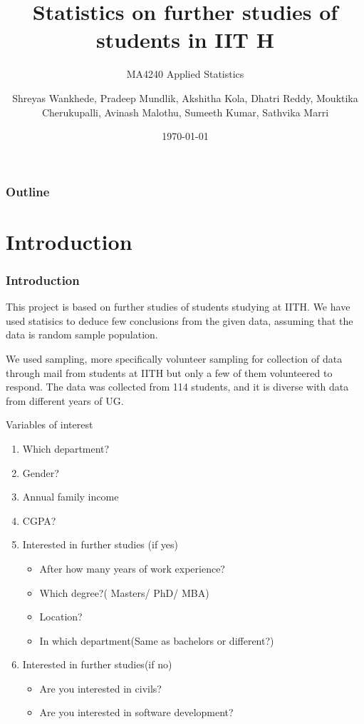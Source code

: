 \documentclass{beamer}
\title{Statistics on further studies of students in IIT H}
\subtitle{MA4240  Applied Statistics}
\author{Shreyas Wankhede, Pradeep Mundlik, Akshitha Kola, Dhatri Reddy, Mouktika Cherukupalli, Avinash Malothu, Sumeeth Kumar, Sathvika Marri}
\institute{Indian Institute of Technology Hyderabad}
\date{\today}
\begin{document}
\begin{frame}
  \titlepage
\end{frame}

\begin{frame}
  \frametitle{Outline}
  \tableofcontents
\end{frame}

\section{Introduction}
\begin{frame}
  \frametitle{Introduction}
  \begin{block}{}  
  This project is based on further studies of students studying at IITH. We have used statisics to deduce few conclusions from the given data, assuming that the data is random sample population.  
  \end{block}

  \begin{block}{}  
  We used sampling, more specifically volunteer sampling for collection of data through mail from students at IITH but only a few of them volunteered to respond. The data was collected from 114 students, and it is diverse with data from different years of UG.
  \end{block}

\end{frame}

\begin{frame}
  \begin{block}{Variables of interest}
      \begin{enumerate}
          \item Which department?
          \item Gender?
          \item Annual family income
          \item CGPA?
          \item Interested in further studies (if yes) 
          \begin{itemize}
              \item After how many years of work experience?
              \item Which degree?( Masters/ PhD/ MBA)
              \item Location?
              \item In which department(Same as bachelors or different?)
          \end{itemize}
          \item Interested in further studies(if no)
          \begin{itemize}
              \item Are you interested in civils?
              \item Are you interested in software development?
          \end{itemize}
      \end{enumerate}
  \end{block}  
\end{frame}
\end{document}
